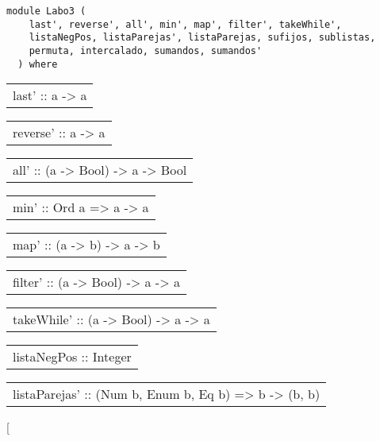 \label{module:Labo3}
\haddockbeginheader
{\haddockverb\begin{verbatim}
module Labo3 (
    last', reverse', all', min', map', filter', takeWhile',
    listaNegPos, listaParejas', listaParejas, sufijos, sublistas,
    permuta, intercalado, sumandos, sumandos'
  ) where\end{verbatim}}
\haddockendheader

\begin{haddockdesc}
\item[\begin{tabular}{@{}l}
last' :: {\char 91}a{\char 93} -> a
\end{tabular}]
\item[\begin{tabular}{@{}l}
reverse' :: {\char 91}a{\char 93} -> {\char 91}a{\char 93}
\end{tabular}]
\item[\begin{tabular}{@{}l}
all' :: (a -> Bool) -> {\char 91}a{\char 93} -> Bool
\end{tabular}]
\item[\begin{tabular}{@{}l}
min' :: Ord a => {\char 91}a{\char 93} -> a
\end{tabular}]
\item[\begin{tabular}{@{}l}
map' :: (a -> b) -> {\char 91}a{\char 93} -> {\char 91}b{\char 93}
\end{tabular}]
\item[\begin{tabular}{@{}l}
filter' :: (a -> Bool) -> {\char 91}a{\char 93} -> {\char 91}a{\char 93}
\end{tabular}]
\item[\begin{tabular}{@{}l}
takeWhile' :: (a -> Bool) -> {\char 91}a{\char 93} -> {\char 91}a{\char 93}
\end{tabular}]
\item[\begin{tabular}{@{}l}
listaNegPos :: {\char 91}Integer{\char 93}
\end{tabular}]
\item[\begin{tabular}{@{}l}
listaParejas' :: (Num b, Enum b, Eq b) => b -> {\char 91}(b, b){\char 93}
\end{tabular}]
\item[\begin{tabular}{@{}l}

\end{tabular}
\end{haddockdesc}
